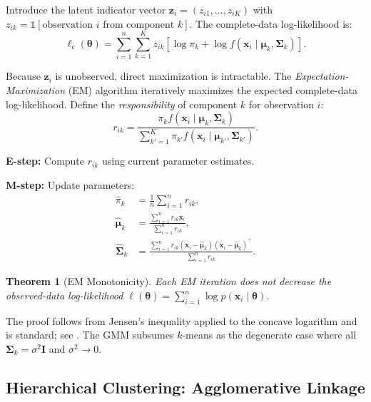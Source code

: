 \documentclass[conference]{IEEEtran}
\newtheorem{theorem}{Theorem}
\begin{document}
Introduce the latent indicator vector $\mathbf{z}_i = (z_{i1}, \ldots, z_{iK})$ with $z_{ik} = \mathbb{1}[\text{observation } i \text{ from component } k]$. The complete-data log-likelihood is:
\begin{equation}
\ell_c(\boldsymbol{\theta}) = \sum_{i=1}^n \sum_{k=1}^K z_{ik} \left[\log \pi_k + \log f(\mathbf{x}_i \mid \boldsymbol{\mu}_k, \boldsymbol{\Sigma}_k)\right].
\end{equation}

Because $\mathbf{z}_i$ is unobserved, direct maximization is intractable. The \emph{Expectation-Maximization} (EM) algorithm \cite{dempster1977maximum} iteratively maximizes the expected complete-data log-likelihood. Define the \emph{responsibility} of component $k$ for observation $i$:
\begin{equation}
r_{ik} = \frac{\pi_k f(\mathbf{x}_i \mid \boldsymbol{\mu}_k, \boldsymbol{\Sigma}_k)}{\sum_{k'=1}^K \pi_{k'} f(\mathbf{x}_i \mid \boldsymbol{\mu}_{k'}, \boldsymbol{\Sigma}_{k'})}.
\label{eq:responsibility}
\end{equation}

\textbf{E-step:} Compute $r_{ik}$ using current parameter estimates.

\textbf{M-step:} Update parameters:
\begin{align}
\hat{\pi}_k &= \frac{1}{n}\sum_{i=1}^n r_{ik}, \label{eq:m_pi}\\
\hat{\boldsymbol{\mu}}_k &= \frac{\sum_{i=1}^n r_{ik} \mathbf{x}_i}{\sum_{i=1}^n r_{ik}}, \label{eq:m_mu}\\
\hat{\boldsymbol{\Sigma}}_k &= \frac{\sum_{i=1}^n r_{ik}(\mathbf{x}_i - \hat{\boldsymbol{\mu}}_k)(\mathbf{x}_i - \hat{\boldsymbol{\mu}}_k)^\top}{\sum_{i=1}^n r_{ik}}. \label{eq:m_sigma}
\end{align}

\begin{theorem}[EM Monotonicity]
Each EM iteration does not decrease the observed-data log-likelihood $\ell(\boldsymbol{\theta}) = \sum_{i=1}^n \log p(\mathbf{x}_i \mid \boldsymbol{\theta})$.
\end{theorem}

The proof follows from Jensen's inequality applied to the concave logarithm and is standard; see \cite{mclachlan2000finite}. The GMM subsumes $k$-means as the degenerate case where all $\boldsymbol{\Sigma}_k = \sigma^2 \mathbf{I}$ and $\sigma^2 \to 0$.

\subsection{Hierarchical Clustering: Agglomerative Linkage}
\end{document}

